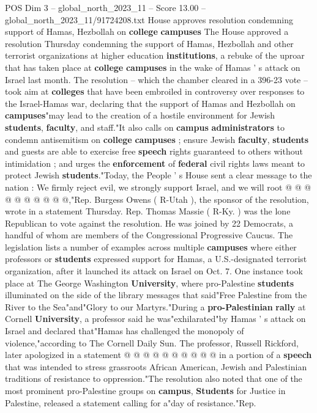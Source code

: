 \begin{textsample}{POS Dim 3 – global\_north\_2023\_11 – Score 13.00 – global\_north\_2023\_11/91724208.txt}  \label{ex:f3_pos_177}
House approves resolution condemning support of Hamas, Hezbollah on \textbf{college} \textbf{campuses} The House approved a resolution Thursday condemning the support of Hamas, Hezbollah and other terrorist organizations at higher education \textbf{institutions}, a rebuke of the uproar that has taken place at \textbf{college} \textbf{campuses} in the wake of Hamas ' s attack on Israel last month.
The resolution -- which the chamber cleared in a 396-23 vote -- took aim at \textbf{colleges} that have been embroiled in controversy over responses to the Israel-Hamas war, declaring that the support of Hamas and Hezbollah on \textbf{campuses}"may lead to the creation of a hostile environment for Jewish \textbf{students}, \textbf{faculty}, and staff."It also calls on \textbf{campus} \textbf{administrators} to condemn antisemitism on \textbf{college} \textbf{campuses} ; ensure Jewish \textbf{faculty}, \textbf{students} and guests are able to exercise free \textbf{speech} rights guaranteed to others without intimidation ; and urges the \textbf{enforcement} of \textbf{federal} civil rights laws meant to protect Jewish \textbf{students}."Today, the People ' s House sent a clear message to the nation : We firmly reject evil, we strongly support Israel, and we will root @ @ @ @ @ @ @ @ @ @,"Rep.
Burgess Owens ( R-Utah ), the sponsor of the resolution, wrote in a statement Thursday.
Rep.
Thomas Massie ( R-Ky. ) was the lone Republican to vote against the resolution.
He was joined by 22 Democrats, a handful of whom are members of the Congressional Progressive Caucus.
The legislation lists a number of examples across multiple \textbf{campuses} where either professors or \textbf{students} expressed support for Hamas, a U.S.-designated terrorist organization, after it launched its attack on Israel on Oct. 7.
One instance took place at The George Washington \textbf{University}, where pro-Palestine \textbf{students} illuminated on the side of the library messages that said"Free Palestine from the River to the Sea"and"Glory to our Martyrs."During a \textbf{pro-Palestinian} \textbf{rally} at Cornell \textbf{University}, a professor said he was"exhilarated"by Hamas ' s attack on Israel and declared that"Hamas has challenged the monopoly of violence,"according to The Cornell Daily Sun.
The professor, Russell Rickford, later apologized in a statement @ @ @ @ @ @ @ @ @ @ in a portion of a \textbf{speech} that was intended to stress grassroots African American, Jewish and Palestinian traditions of resistance to oppression."The resolution also noted that one of the most prominent pro-Palestine groups on \textbf{campus}, \textbf{Students} for Justice in Palestine, released a statement calling for a"day of resistance."Rep.

\end{textsample}
